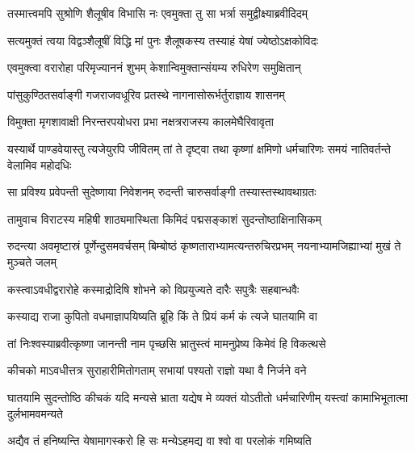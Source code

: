 \twolineshloka
{तस्मात्त्वमपि सुश्रोणि शैलूषीव विभासि नः}
{एवमुक्ता तु सा भर्त्रा समुद्वीक्ष्याब्रवीदिदम्}


\twolineshloka
{सत्यमुक्तं त्वया विद्वञ्शैलूषीं विद्धि मां पुनः}
{शैलूषकस्य तस्याहं येषां ज्येष्ठोऽक्षकोविदः}


\twolineshloka
{एवमुक्त्वा वरारोहा परिमृज्याननं शुभम्}
{केशान्विमुक्तान्संयम्य रुधिरेण समुक्षितान्}





\twolineshloka
{पांसुकुण्ठितसर्वाङ्गी गजराजवधूरिव}
{प्रतस्थे नागनासोरूर्भर्तुराज्ञाय शासनम्}


\twolineshloka
{विमुक्ता मृगशावाक्षी निरन्तरपयोधरा}
{प्रभा नक्षत्रराजस्य कालमेघैरिवावृता}


\threelineshloka
{यस्यार्थे पाण्डवेयास्तु त्यजेयुरपि जीवितम्}
{तां ते दृष्ट्वा तथा कृष्णां क्षमिणो धर्मचारिणः}
{समयं नातिवर्तन्ते वेलामिव महोदधिः}


\twolineshloka
{सा प्रविश्य प्रवेपन्ती सुदेष्णाया निवेशनम्}
{रुदन्ती चारुसर्वाङ्गी तस्यास्तस्थावथाग्रतः}


\twolineshloka
{तामुवाच विराटस्य महिषी शाठ्यमास्थिता}
{किमिदं पद्मसङ्काशं सुदन्तोष्ठाक्षिनासिकम्}


\threelineshloka
{रुदन्त्या अवमृष्टास्रं पूर्णेन्दुसमवर्चसम्}
{बिम्बोष्ठं कृष्णताराभ्यामत्यन्तरुचिरप्रभम्}
{नयनाभ्यामजिह्याभ्यां मुखं ते मुञ्चते जलम्}


\twolineshloka
{कस्त्वाऽवधीद्वरारोहे कस्माद्रोदिषि शोभने}
{को विप्रयुज्यते दारैः सपुत्रैः सहबान्धवैः}


\twolineshloka
{कस्याद्य राजा कुपितो वधमाज्ञापयिष्यति}
{ब्रूहि किं ते प्रियं कर्म कं त्यजे घातयामि वा}



\twolineshloka
{तां निःश्वस्याब्रवीत्कृष्णा जानन्ती नाम पृच्छसि}
{भ्रातुस्त्वं मामनुप्रेष्य किमेवं हि विकत्थसे}


\twolineshloka
{कीचको माऽवधीत्तत्र सुराहारीमितोगताम्}
{सभायां पश्यतो राज्ञो यथा वै निर्जने वने}




\threelineshloka
{घातयामि सुदन्तोष्ठि कीचकं यदि मन्यसे}
{भ्राता यद्येष मे व्यक्तं योऽतीतो धर्मचारिणीम्}
{यस्त्वां कामाभिभूतात्मा दुर्लभामवमन्यते}



\twolineshloka
{अद्यैव तं हनिष्यन्ति येषामागस्करो हि सः}
{मन्येऽहमद्य वा श्वो वा परलोकं गमिष्यति}


